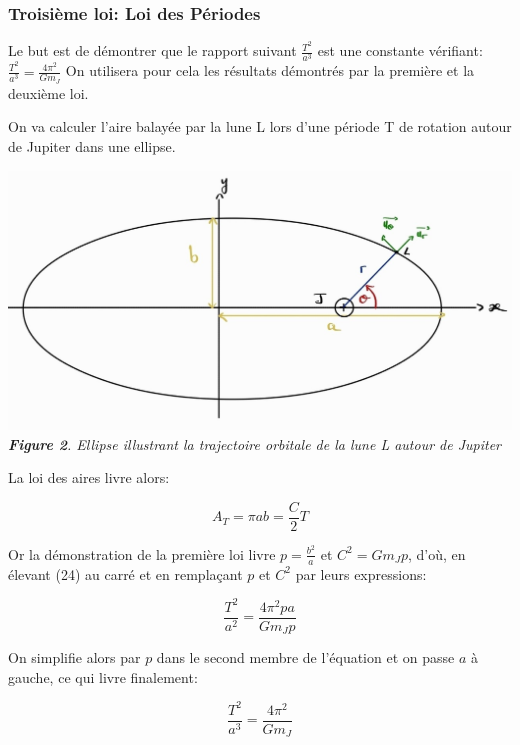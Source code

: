 \documentclass{aa}
\begin{document}
\subsubsection{Troisième loi: Loi des Périodes}


    Le but est de démontrer que le rapport suivant $\frac{T^2}{a^3}$ est une constante vérifiant: $\frac{T^2}{a^3} = \frac{4\pi^2}{Gm_J}$ 
    On utilisera pour cela les résultats démontrés par la première et la deuxième loi. \break

    On va calculer l'aire balayée par la lune L lors d'une période T de rotation autour de Jupiter dans une ellipse. \\

    \begin{center}
        \includegraphics[scale = 0.25]{images/ellipse1.jpg}    
        \emph{\textbf{Figure 2}. Ellipse illustrant la trajectoire orbitale de la lune L autour de Jupiter}
    \end{center}
    
\begin{flushleft}
    

    La loi des aires livre alors:

    \begin{equation}
        A_T = \pi ab = \frac{C}{2}T
    \end{equation}
\end{flushleft} 

    Or la  démonstration de la première loi livre $p = \frac{b^2}{a}$ et $C^2 = Gm_Jp$, d'où, en élevant (24) au carré et en remplaçant $p$ et $C^2$ par leurs expressions:

    \begin{equation}
        \frac{T^2}{a^2} = \frac{4\pi ^2 pa}{Gm_Jp}
    \end{equation}

    On simplifie alors par $p$ dans le second membre de l'équation et on passe $a$ à gauche, ce qui livre finalement: 
    
    \begin{equation}
        \frac{T^2}{a^3} = \frac{4 \pi ^2}{Gm_J}
    \end{equation}
\end{document}

